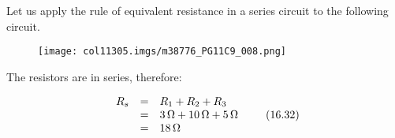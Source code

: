 Let us apply the rule of equivalent resistance in a series circuit to the following circuit.\par 
          \label{m38776*id64722}
    \setcounter{subfigure}{0}
	\begin{figure}[H] %
    \begin{center}
    \label{m38776*id64726!!!underscore!!!media}\label{m38776*id64726!!!underscore!!!printimage}\texttt{[image: col11305.imgs/m38776\_PG11C9\_008.png]} %
      \vspace{2pt}
    \vspace{.1in}
    \end{center}
 \end{figure}       
          \par 
          \label{m38776*id64732}The resistors are in series, therefore:\par 
          \label{m38776*id64736}\nopagebreak\noindent{}
    \begin{equation}
    \begin{array}{ccc}\hfill {R}_{s}& =& {R}_{1}+{R}_{2}+{R}_{3}\hfill \\ & =& 3\phantom{\rule{0.166667em}{0ex}}\mathrm{\Omega }+10\phantom{\rule{0.166667em}{0ex}}\mathrm{\Omega }+5\phantom{\rule{0.166667em}{0ex}}\mathrm{\Omega }\hfill \\ & =& 18\phantom{\rule{0.166667em}{0ex}}\mathrm{\Omega }\hfill \end{array}\tag{16.32}
      \end{equation}
\label{m38776*eip-186}
